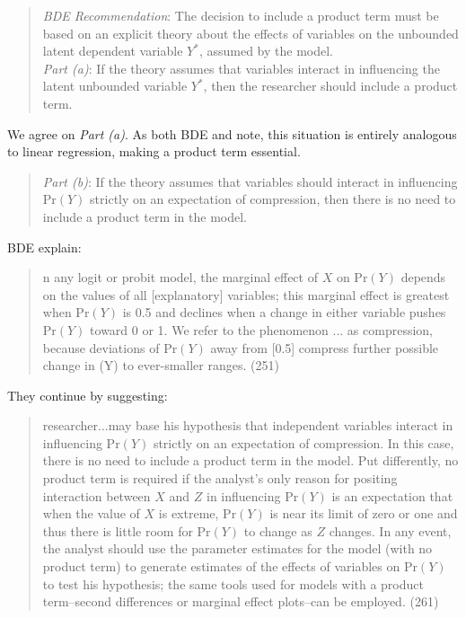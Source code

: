 \documentclass[12pt]{article}
\begin{document}
\begin{quote}\singlespace
\textit{BDE Recommendation}: The decision to include a product term must be based on an explicit theory about the effects of variables on the unbounded latent dependent variable $Y^*$, assumed by the model.\vspace{2mm}\\
\indent \textit{Part (a)}: If the theory assumes that variables interact in influencing the latent unbounded variable $Y^*$, then the researcher should include a product term.
\end{quote}
\doublespace
We agree on \textit{Part (a)}. As both BDE and \cite{Nagler1991} note, this situation is entirely analogous to linear regression, making a product term essential.
\begin{quote}\singlespace
\indent \textit{Part (b)}: If the theory assumes that variables should interact in influencing $\text{Pr}(Y)$ strictly on an expectation of compression, then there is no need to include a product term in the model.
\end{quote}\doublespace
BDE explain:
\begin{quote}\singlespace 
[I]n any logit or probit model, the marginal effect
of $X$ on $\text{Pr}(Y)$ depends on the values of all [explanatory]
variables; this marginal effect is greatest when $\text{Pr}(Y)$ is
0.5 and declines when a change in either variable pushes
$\text{Pr}(Y)$ toward 0 or 1. We refer to the phenomenon ... as compression,
because deviations of $\text{Pr}(Y)$ away from [0.5] compress
further possible change in (Y) to ever-smaller ranges.
 (251)
 \end{quote}\doublespace
They continue by suggesting:
\begin{quote}\singlespace
[A] researcher...may base his hypothesis that independent variables interact in influencing $\text{Pr}(Y)$ strictly on an expectation of compression. In this case, there is no need to include a product term in the model. Put differently, no product term is required if the analyst's only reason for positing interaction between $X$ and $Z$ in influencing $\text{Pr}(Y)$ is an expectation that when the value of $X$ is extreme, $\text{Pr}(Y)$ is near its limit of zero or one and thus there is little room for $\text{Pr}(Y)$ to change as $Z$ changes. In any event, the analyst should use the parameter estimates for the model (with no product term) to generate estimates of the effects of variables on $\text{Pr}(Y)$ to test his hypothesis; the same tools used for models with a product term--second differences or marginal effect plots--can be employed.
(261)
\end{quote}
\doublespace
\end{document}
